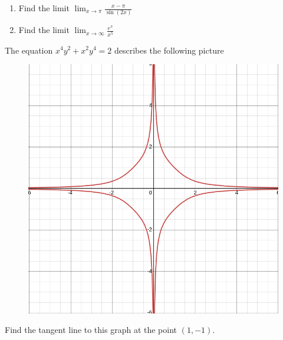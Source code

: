 \documentclass[12pt]{amsart}
\begin{document}
\newpage

\begin{problem}[20 points]
\begin{enumerate}
	\item Find the limit $\displaystyle \lim_{x\to \pi} \frac{x - \pi}{\sin (2x)}$
	      \vspace{10cm}
	\item Find the limit $\displaystyle \lim_{x\to \infty} \frac{e^x}{x^5}$
	      \vspace{10cm}
\end{enumerate}
\end{problem}

\newpage

\begin{problem}[20 points]
The equation $x^4 y^2 + x^2 y^4 = 2$ describes the following picture
\begin{figure}[ht!]
	\begin{center}
		\includegraphics[width = 0.6\linewidth]{fig1.png}
	\end{center}
\end{figure}
\end{problem}
Find the tangent line to this graph at the point $(1,-1)$.
\end{document}
